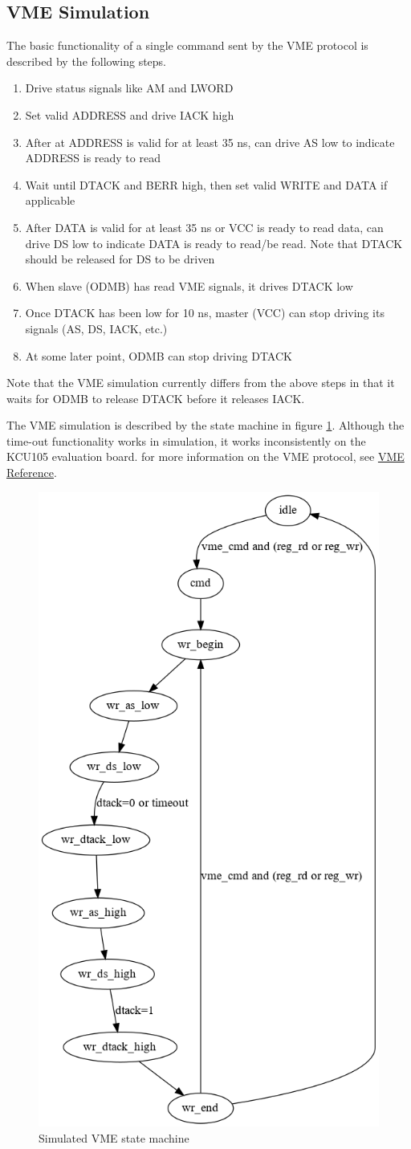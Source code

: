 \documentclass[10pt,a4paper]{article}
\begin{document}
\subsection{VME Simulation}

The basic functionality of a single command sent by the VME protocol is described by the following steps.

\begin{enumerate}
\item Drive status signals like AM and LWORD
\item Set valid ADDRESS and drive IACK high
\item After at ADDRESS is valid for at least 35 ns, can drive AS low to indicate ADDRESS is ready to read
\item Wait until DTACK and BERR high, then set valid WRITE and DATA if applicable
\item After DATA is valid for at least 35 ns or VCC is ready to read data, can drive DS low to indicate DATA is ready to read/be read. Note that DTACK should be released for DS to be driven
\item When slave (ODMB) has read VME signals, it drives DTACK low
\item Once DTACK has been low for 10 ns, master (VCC) can stop driving its signals (AS, DS, IACK, etc.)
\item At some later point, ODMB can stop driving DTACK
\end{enumerate}

Note that the VME simulation currently differs from the above steps in that it waits for ODMB to release DTACK before it releases IACK. 

The VME simulation is described by the state machine in figure \ref{fig:vmestatemachine}. Although the time-out functionality works in simulation, it works inconsistently on the KCU105 evaluation board. for more information on the VME protocol, see \href{http://www.interfacebus.com/Design_Connector_VME.html}{VME Reference}.

\begin{figure}[H]
\includegraphics[width= 0.4 \textwidth]{figures/vmestates.png}
\caption{Simulated VME state machine}
\label{fig:vmestatemachine}
\end{figure}
\end{document}

